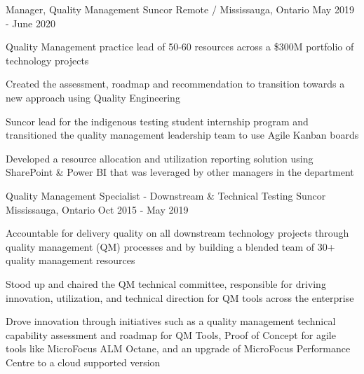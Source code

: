 \begin{cventries}
  \cventry
    {Manager, Quality Management} %
    {Suncor} %
    {Remote / Mississauga, Ontario} %
    {May 2019 - June 2020} %
    {
      \begin{cvitems} %
        \item {Quality Management practice lead of 50-60 resources across a \$300M portfolio of technology projects}
        \item {Created the assessment, roadmap and recommendation to transition towards a new approach using Quality Engineering}
        \item {Suncor lead for the indigenous testing student internship program and transitioned the quality management leadership team to use Agile Kanban boards}
        \item {Developed a resource allocation and utilization reporting solution using SharePoint \& Power BI that was leveraged by other managers in the department}
      \end{cvitems}
    }

  \cventry
    {Quality Management Specialist - Downstream \& Technical Testing} %
    {Suncor} %
    {Mississauga, Ontario} %
    {Oct 2015 - May 2019} %
    {
      \begin{cvitems} %
        \item {Accountable for delivery quality on all downstream technology projects through quality management (QM) processes and by building a blended team of 30+ quality management resources}
        \item {Stood up and chaired the QM technical committee, responsible for driving innovation, utilization, and technical direction for QM tools across the enterprise}
        \item {Drove innovation through initiatives such as a quality management technical capability assessment and roadmap for QM Tools,  Proof of Concept for agile tools like MicroFocus ALM Octane, and an upgrade of MicroFocus Performance Centre to a cloud supported version}
      \end{cvitems}
    }


\end{cventries}
